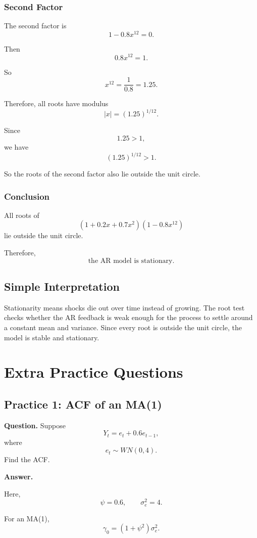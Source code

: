 \documentclass[12pt]{article}
\begin{document}
\subsubsection*{Second Factor}

The second factor is
\[
1-0.8x^{12}=0.
\]

Then
\[
0.8x^{12}=1.
\]

So
\[
x^{12}=\frac{1}{0.8}=1.25.
\]

Therefore, all roots have modulus
\[
|x|=(1.25)^{1/12}.
\]

Since
\[
1.25>1,
\]
we have
\[
(1.25)^{1/12}>1.
\]

So the roots of the second factor also lie outside the unit circle.

\subsubsection*{Conclusion}

All roots of
\[
(1+0.2x+0.7x^2)(1-0.8x^{12})
\]
lie outside the unit circle.

Therefore,
\[
\boxed{\text{the AR model is stationary.}}
\]

\subsection*{Simple Interpretation}

Stationarity means shocks die out over time instead of growing.  The root test
checks whether the AR feedback is weak enough for the process to settle around a
constant mean and variance.  Since every root is outside the unit circle, the
model is stable and stationary.

\section*{Extra Practice Questions}

\subsection*{Practice 1: ACF of an MA(1)}

\textbf{Question.} Suppose
\[
Y_t=e_t+0.6e_{t-1},
\]
where
\[
e_t\sim WN(0,4).
\]
Find the ACF.

\textbf{Answer.}

Here,
\[
\psi=0.6,\qquad \sigma_e^2=4.
\]

For an MA(1),
\[
\gamma_0=(1+\psi^2)\sigma_e^2.
\]
\end{document}

